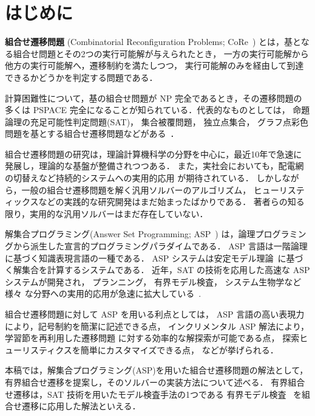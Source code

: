 ﻿%
\section{はじめに}\label{chap:introduction}

\textbf{組合せ遷移問題}
(Combinatorial Reconfiguration Problems;
CoRe~\cite{core:ItoDHPSUU11,core:Nishimura18,core:Heuvel13})
とは，基となる組合せ問題とその2つの実行可能解が与えられたとき，
一方の実行可能解から他方の実行可能解へ，遷移制約を満たしつつ，
実行可能解のみを経由して到達できるかどうかを判定する問題である．

計算困難性について，基の組合せ問題が NP 完全であるとき，その遷移問題の
多くは PSPACE 完全になることが知られている．代表的なものとしては，
命題論理の充足可能性判定問題(SAT)，
集合被覆問題，
独立点集合，
グラフ点彩色問題を基とする組合せ遷移問題などがある~\cite{%
  core:gcp:BonsmaC09,%
  core:gcp:CerecedaHJ11,%
  core:sat:GopalanKMP09,%
  core:ItoDHPSUU11%
}．

組合せ遷移問題の研究は，理論計算機科学の分野を中心に，最近10年で急速に
発展し，理論的な基盤が整備されつつある．
また，実社会においても，配電網の切替えなど持続的システムへの実用的応用
が期待されている．
しかしながら，一般の組合せ遷移問題を解く汎用ソルバーのアルゴリズム，
ヒューリスティックスなどの実践的な研究開発はまだ始まったばかりである．
著者らの知る限り，実用的な汎用ソルバーはまだ存在していない．

解集合プログラミング(Answer Set Programming; ASP~\cite{%
Baral03:cambridge,%
Gelfond88:iclp,%
Inoue08:jssst,%
Niemela99:amai})
は，論理プログラミングから派生した宣言的プログラミングパラダイムである．
ASP 言語は一階論理に基づく知識表現言語の一種である．
ASP システムは安定モデル理論~\cite{Gelfond88:iclp}に基づく解集合を計算するシステムである．
近年，SAT の技術を応用した高速な ASP システムが開発され，
プランニング，
有界モデル検査，
システム生物学など様々
な分野への実用的応用が急速に拡大している~\cite{Erdem16:AI}.

組合せ遷移問題に対して ASP を用いる利点としては，
ASP 言語の高い表現力により，記号制約を簡潔に記述できる点，
インクリメンタル ASP 解法により，学習節を再利用した遷移問題
に対する効率的な解探索が可能である点，
探索ヒューリスティクスを簡単にカスタマイズできる点，
などが挙げられる．

本稿では，解集合プログラミング(ASP)を用いた組合せ遷移問題の解法として，
有界組合せ遷移を提案し，そのソルバーの実装方法について述べる．
有界組合せ遷移は，SAT 技術を用いたモデル検査手法の1つである
有界モデル検査~\cite{%
  JSAI:BanbaraT10,DBLP:series/faia/Biere09,DBLP:conf/tacas/BiereCCZ99}%
を組合せ遷移に応用した解法といえる．

